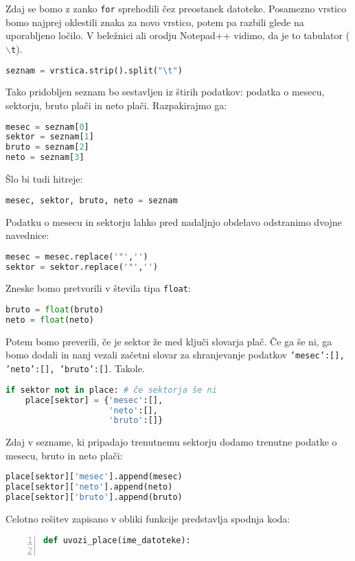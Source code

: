 \begin{resitev}
Zdaj se bomo z zanko \texttt{for} sprehodili čez preostanek datoteke. Posamezno vrstico bomo najprej oklestili znaka za novo vrstico, potem pa razbili glede na uporabljeno ločilo. V beležnici ali orodju Notepad++ vidimo, da je to tabulator (\texttt{$\backslash$t}).
\begin{lstlisting}[language=Python, showstringspaces=false]
seznam = vrstica.strip().split("\t")
\end{lstlisting}
Tako pridobljen seznam bo sestavljen iz štirih podatkov: podatka o mesecu, sektorju, bruto plači in neto plači. Razpakirajmo ga:
\begin{lstlisting}[language=Python, showstringspaces=false]
mesec = seznam[0]
sektor = seznam[1]
bruto = seznam[2]
neto = seznam[3]
\end{lstlisting}
Šlo bi tudi hitreje:
\begin{lstlisting}[language=Python, showstringspaces=false]
mesec, sektor, bruto, neto = seznam
\end{lstlisting}
Podatku o mesecu in sektorju lahko pred nadaljnjo obdelavo odstranimo dvojne navednice:
\begin{lstlisting}[language=Python, showstringspaces=false]
mesec = mesec.replace('"','')
sektor = sektor.replace('"','')
\end{lstlisting}
Zneske bomo pretvorili v števila tipa \texttt{float}:
\begin{lstlisting}[language=Python, showstringspaces=false]
bruto = float(bruto)
neto = float(neto)
\end{lstlisting}

Potem bomo preverili, če je sektor že med ključi slovarja plač. Če ga še ni, ga bomo dodali in nanj vezali začetni slovar za shranjevanje podatkov \texttt{{'mesec':[], 'neto':[], 'bruto':[]}}. Takole.
\begin{lstlisting}[language=Python, showstringspaces=false]
if sektor not in place: # če sektorja še ni
    place[sektor] = {'mesec':[], 
                     'neto':[], 
                     'bruto':[]}
\end{lstlisting}

Zdaj v sezname, ki pripadajo trenutnemu sektorju dodamo trenutne podatke o mesecu, bruto in neto plači:
\begin{lstlisting}[language=Python, showstringspaces=false]
place[sektor]['mesec'].append(mesec)
place[sektor]['neto'].append(neto)
place[sektor]['bruto'].append(bruto)
\end{lstlisting}

Celotno rešitev zapisano v obliki funkcije predstavlja spodnja koda:
\begin{lstlisting}[language=Python, showstringspaces=false,numbers=left]
def uvozi_place(ime_datoteke):
    

\end{lstlisting}
\end{resitev}
